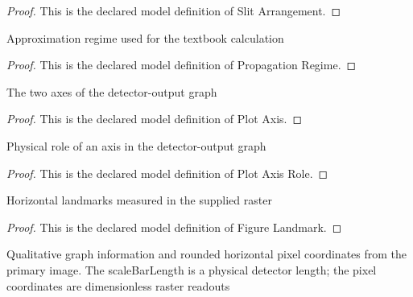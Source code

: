 \begin{proof}
  This is the declared model definition of Slit Arrangement.
\end{proof}
\begin{definition}
  \label{def:physics:phyx-mini-0500:phyxminiproblems-problemphyxmini0500-propagationregime}
  Approximation regime used for the textbook calculation
\end{definition}
\begin{proof}
  This is the declared model definition of Propagation Regime.
\end{proof}
\begin{definition}
  \label{def:physics:phyx-mini-0500:phyxminiproblems-problemphyxmini0500-plotaxis}
  The two axes of the detector-output graph
\end{definition}
\begin{proof}
  This is the declared model definition of Plot Axis.
\end{proof}
\begin{definition}
  \label{def:physics:phyx-mini-0500:phyxminiproblems-problemphyxmini0500-plotaxisrole}
  Physical role of an axis in the detector-output graph
\end{definition}
\begin{proof}
  This is the declared model definition of Plot Axis Role.
\end{proof}
\begin{definition}
  \label{def:physics:phyx-mini-0500:phyxminiproblems-problemphyxmini0500-figurelandmark}
  Horizontal landmarks measured in the supplied raster
\end{definition}
\begin{proof}
  This is the declared model definition of Figure Landmark.
\end{proof}
\begin{definition}
  \label{def:physics:phyx-mini-0500:phyxminiproblems-problemphyxmini0500-neutrondetectorfigure}
  Qualitative graph information and rounded horizontal pixel coordinates from the primary image. The scaleBarLength is a physical detector length; the pixel coordinates are dimensionless raster readouts
\end{definition}
